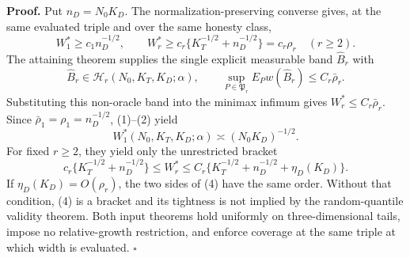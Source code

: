 \textbf{Proof.}
Put \(n_D=N_0K_D\).  The normalization-preserving converse gives, at the
same evaluated triple and over the same honesty class,
\[
 W_1^*\ge c_1n_D^{-1/2},
 \qquad
 W_r^*\ge c_r\{K_T^{-1/2}+n_D^{-1/2}\}=c_r\rho_r
 \quad(r\ge2).                                             \tag{1}
\]
The attaining theorem supplies the single explicit measurable band
\(\widehat B_r\) with
\[
 \widehat B_r\in\mathcal H_r(N_0,K_T,K_D;\alpha),
 \qquad
 \sup_{P\in\mathfrak P_r}E_Pw(\widehat B_r)
 \le C_r\bar\rho_r.                                       \tag{2}
\]
Substituting this non-oracle band into the minimax infimum gives
\(W_r^*\le C_r\bar\rho_r\).  Since
\(\bar\rho_1=\rho_1=n_D^{-1/2}\), (1)--(2) yield
\[
 W_1^*(N_0,K_T,K_D;\alpha)\asymp(N_0K_D)^{-1/2}.           \tag{3}
\]
For fixed \(r\ge2\), they yield only the unrestricted bracket
\[
 c_r\{K_T^{-1/2}+n_D^{-1/2}\}
 \le W_r^*
 \le C_r\{K_T^{-1/2}+n_D^{-1/2}+\eta_D(K_D)\}.            \tag{4}
\]
If \(\eta_D(K_D)=O(\rho_r)\), the two sides of (4) have the same order.
Without that condition, (4) is a bracket and its tightness is not implied by
the random-quantile validity theorem.  Both input theorems hold uniformly on
three-dimensional tails, impose no relative-growth restriction, and enforce
coverage at the same triple at which width is evaluated. \(\square\)